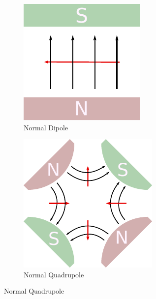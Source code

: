 \begin{figure}[!htb]
    \newlength{\magnetheight}
    \setlength{\magnetheight}{93px}
    \centering
    \begin{subfigure}{0.24\textwidth}
        \includegraphics[height=\magnetheight]{images/magnets/dipole_normal.pdf}
        \caption{
           Normal Dipole 
        }
        \label{fig:MBNorm}
    \end{subfigure}
    \begin{subfigure}{0.243\textwidth}
        \includegraphics[height=\magnetheight]{images/magnets/quadrupole_normal_f.pdf}
        \caption{
           Normal Quadrupole 
        }
        \label{fig:MQNorm}
    \end{subfigure}

\end{figure}
